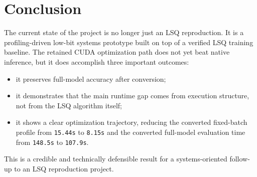 \documentclass[11pt,a4paper]{article}
\begin{document}
\section{Conclusion}
The current state of the project is no longer just an LSQ reproduction. It is a profiling-driven low-bit systems prototype built on top of a verified LSQ training baseline. The retained CUDA optimization path does not yet beat native inference, but it does accomplish three important outcomes:
\begin{itemize}
  \item it preserves full-model accuracy after conversion;
  \item it demonstrates that the main runtime gap comes from execution structure, not from the LSQ algorithm itself;
  \item it shows a clear optimization trajectory, reducing the converted fixed-batch profile from \texttt{15.44s} to \texttt{8.15s} and the converted full-model evaluation time from \texttt{148.5s} to \texttt{107.9s}.
\end{itemize}

This is a credible and technically defensible result for a systems-oriented follow-up to an LSQ reproduction project.
\end{document}
